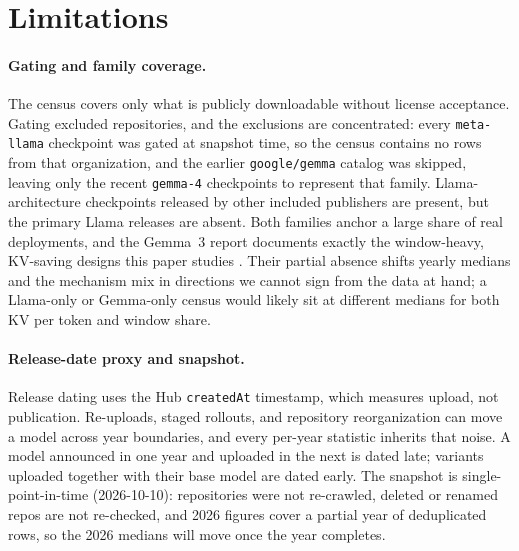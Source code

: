 \section{Limitations}\label{sec:limitations}

\paragraph{Gating and family coverage.}
The census covers only what is publicly downloadable without license acceptance.
Gating excluded \kvcGatedSkipped{} repositories, and the exclusions are
concentrated: every \texttt{meta-llama} checkpoint was gated at snapshot time,
so the census contains no rows from that organization, and the earlier
\texttt{google/gemma} catalog was skipped, leaving only the recent
\texttt{gemma-4} checkpoints to represent that family. Llama-architecture checkpoints released by other included publishers are present, but the primary Llama releases are absent. Both families anchor a
large share of real deployments, and the Gemma~3 report documents exactly the
window-heavy, KV-saving designs this paper studies \cite{gemmateam2025gemma3}.
Their partial absence shifts yearly medians and the mechanism mix in directions
we cannot sign from the data at hand; a Llama-only or Gemma-only census would
likely sit at different medians for both KV per token and window share.

\paragraph{Release-date proxy and snapshot.}
Release dating uses the Hub \texttt{createdAt} timestamp, which measures upload,
not publication. Re-uploads, staged rollouts, and repository reorganization can
move a model across year boundaries, and every per-year statistic inherits that
noise. A model announced in one year and uploaded in the next is dated late;
variants uploaded together with their base model are dated early. The snapshot is single-point-in-time (2026-10-10): repositories were not
re-crawled, deleted or renamed repos are not re-checked, and 2026 figures cover
a partial year of \kvcRqOneNTwentySix{} deduplicated rows, so the 2026 medians
will move once the year completes.

